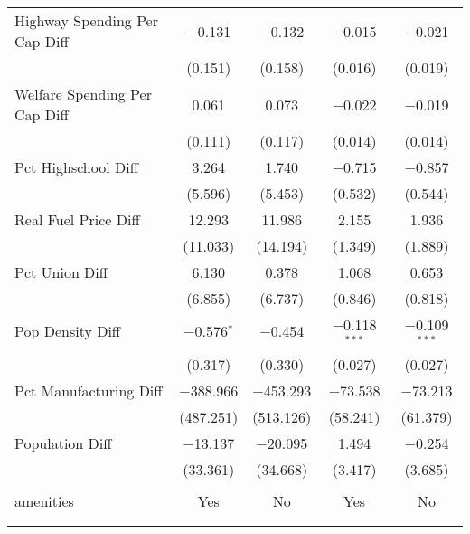 \begin{table}[!htbp]
\begin{tabular}{@{\extracolsep{5pt}}lcccc}
  Highway Spending Per Cap Diff & $-$0.131 & $-$0.132 & $-$0.015 & $-$0.021 \\ 
  & (0.151) & (0.158) & (0.016) & (0.019) \\ 
  Welfare Spending Per Cap Diff & 0.061 & 0.073 & $-$0.022 & $-$0.019 \\ 
  & (0.111) & (0.117) & (0.014) & (0.014) \\ 
  Pct Highschool Diff & 3.264 & 1.740 & $-$0.715 & $-$0.857 \\ 
  & (5.596) & (5.453) & (0.532) & (0.544) \\ 
  Real Fuel Price Diff & 12.293 & 11.986 & 2.155 & 1.936 \\ 
  & (11.033) & (14.194) & (1.349) & (1.889) \\ 
  Pct Union Diff & 6.130 & 0.378 & 1.068 & 0.653 \\ 
  & (6.855) & (6.737) & (0.846) & (0.818) \\ 
  Pop Density Diff & $-$0.576$^{*}$ & $-$0.454 & $-$0.118$^{***}$ & $-$0.109$^{***}$ \\ 
  & (0.317) & (0.330) & (0.027) & (0.027) \\ 
  Pct Manufacturing Diff & $-$388.966 & $-$453.293 & $-$73.538 & $-$73.213 \\ 
  & (487.251) & (513.126) & (58.241) & (61.379) \\ 
  Population Diff & $-$13.137 & $-$20.095 & 1.494 & $-$0.254 \\ 
  & (33.361) & (34.668) & (3.417) & (3.685) \\ 
 \hline \\[-1.8ex] 
amenities & Yes & No & Yes & No \\ 
\hline \\[-1.8ex] 
\hline 
\hline \\[-1.8ex] 
\end{tabular} 
\end{table} 
